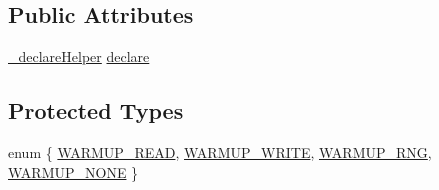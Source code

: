 \subsection*{Public Attributes}
\begin{DoxyCompactItemize}
\item 
\hyperlink{classperf_1_1TestBase_aac6d781fcc79b1daa0c48d37d837bd64}{\-\_\-declare\-Helper} \hyperlink{classperf_1_1TestBase_a348d9b977a878ef8bdc226cf0b4ab43d}{declare}
\end{DoxyCompactItemize}
\subsection*{Protected Types}
\begin{DoxyCompactItemize}
\item 
enum \{ \hyperlink{classperf_1_1TestBase_ac5e0802870e938aef3c7eca288eaa57eae6c5cd60009a21181231f958eb0564ac}{W\-A\-R\-M\-U\-P\-\_\-\-R\-E\-A\-D}, 
\hyperlink{classperf_1_1TestBase_ac5e0802870e938aef3c7eca288eaa57eaab6bfe3e63bf74d1ae114862abe8ad77}{W\-A\-R\-M\-U\-P\-\_\-\-W\-R\-I\-T\-E}, 
\hyperlink{classperf_1_1TestBase_ac5e0802870e938aef3c7eca288eaa57eabb2dbb88f8e032a1603682a21035f673}{W\-A\-R\-M\-U\-P\-\_\-\-R\-N\-G}, 
\hyperlink{classperf_1_1TestBase_ac5e0802870e938aef3c7eca288eaa57ea0ad7cd6ed1cb1f5ab9dd17f20f4d73f3}{W\-A\-R\-M\-U\-P\-\_\-\-N\-O\-N\-E}
 \}
\end{DoxyCompactItemize}
